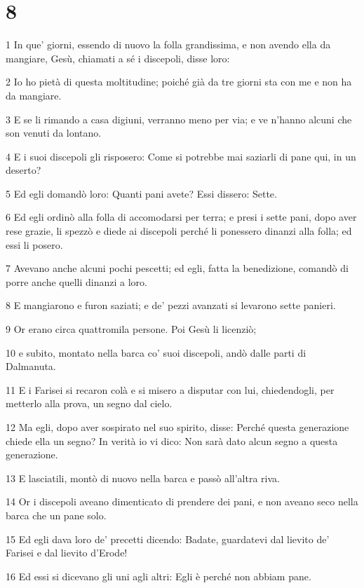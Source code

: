 \chapter{8}

\par 1 In que' giorni, essendo di nuovo la folla grandissima, e non avendo ella da mangiare, Gesù, chiamati a sé i discepoli, disse loro:
\par 2 Io ho pietà di questa moltitudine; poiché già da tre giorni sta con me e non ha da mangiare.
\par 3 E se li rimando a casa digiuni, verranno meno per via; e ve n'hanno alcuni che son venuti da lontano.
\par 4 E i suoi discepoli gli risposero: Come si potrebbe mai saziarli di pane qui, in un deserto?
\par 5 Ed egli domandò loro: Quanti pani avete? Essi dissero: Sette.
\par 6 Ed egli ordinò alla folla di accomodarsi per terra; e presi i sette pani, dopo aver rese grazie, li spezzò e diede ai discepoli perché li ponessero dinanzi alla folla; ed essi li posero.
\par 7 Avevano anche alcuni pochi pescetti; ed egli, fatta la benedizione, comandò di porre anche quelli dinanzi a loro.
\par 8 E mangiarono e furon saziati; e de' pezzi avanzati si levarono sette panieri.
\par 9 Or erano circa quattromila persone. Poi Gesù li licenziò;
\par 10 e subito, montato nella barca co' suoi discepoli, andò dalle parti di Dalmanuta.
\par 11 E i Farisei si recaron colà e si misero a disputar con lui, chiedendogli, per metterlo alla prova, un segno dal cielo.
\par 12 Ma egli, dopo aver sospirato nel suo spirito, disse: Perché questa generazione chiede ella un segno? In verità io vi dico: Non sarà dato alcun segno a questa generazione.
\par 13 E lasciatili, montò di nuovo nella barca e passò all'altra riva.
\par 14 Or i discepoli aveano dimenticato di prendere dei pani, e non aveano seco nella barca che un pane solo.
\par 15 Ed egli dava loro de' precetti dicendo: Badate, guardatevi dal lievito de' Farisei e dal lievito d'Erode!
\par 16 Ed essi si dicevano gli uni agli altri: Egli è perché non abbiam pane.
